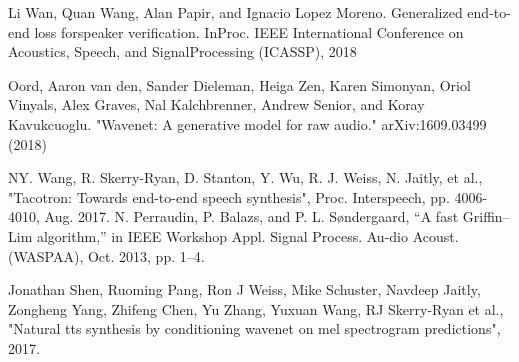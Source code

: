 \documentclass[runningheads]{llncs}
\begin{document}

% 
%
\begin{thebibliography}{8}

Li Wan, Quan Wang, Alan Papir, and Ignacio Lopez Moreno. Generalized end-to-end loss forspeaker verification. InProc. IEEE International Conference on Acoustics, Speech, and SignalProcessing (ICASSP), 2018

Oord, Aaron van den, Sander Dieleman, Heiga Zen, Karen Simonyan, Oriol Vinyals, Alex Graves, Nal Kalchbrenner, Andrew Senior, and Koray Kavukcuoglu. "Wavenet: A generative model for raw audio."  arXiv:1609.03499 (2018)

 NY. Wang, R. Skerry-Ryan, D. Stanton, Y. Wu, R. J. Weiss, N. Jaitly, et al., "Tacotron: Towards end-to-end speech synthesis", Proc. Interspeech, pp. 4006-4010, Aug. 2017.
 N. Perraudin, P. Balazs, and P. L. Søndergaard, “A fast Griffin–Lim algorithm,”  in IEEE Workshop Appl. Signal Process. Au-dio Acoust. (WASPAA), Oct. 2013, pp. 1–4.
 
Jonathan Shen, Ruoming Pang, Ron J Weiss, Mike Schuster, Navdeep Jaitly, Zongheng Yang, Zhifeng Chen, Yu Zhang, Yuxuan Wang, RJ Skerry-Ryan et al., "Natural tts synthesis by conditioning wavenet on mel spectrogram predictions", 2017.
\end{thebibliography}
\end{document}
